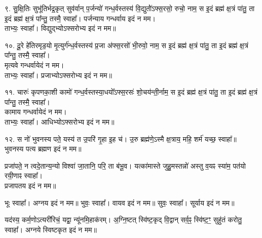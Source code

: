 ९. सु॒क्षि॒तिः सुभू॑तिर्भद्र॒कृत् सुव॑र्वान् प॒र्जन्यो॑ गन्ध॒र्वस्तस्य॑ वि॒द्युतो॑॑ऽफ्स॒रसो॒ रुचो॒ नाम॒ स इ॒दं ब्रह्म॑ क्ष॒त्रं पा॑तु॒ ता इ॒दं ब्रह्म॑ क्ष॒त्रं पा᳚न्तु॒ तस्मै॒ स्वाहा᳚। पर्जन्याय गन्धर्वाय इदं न मम।\\
ताभ्यः॒ स्वाहा᳚। विद्युद्भ्योऽफ्सरोभ्य इदं न मम॥

१०. दू॒रे हे॑तिरमृड॒यो मृ॒त्युर्ग॑न्ध॒र्वस्तस्य॑ प्र॒जा अ॑फ्स॒रसो॑ भी॒रुवो॒ नाम॒ स इ॒दं ब्रह्म॑ क्ष॒त्रं पा॑तु॒ ता इ॒दं ब्रह्म॑ क्ष॒त्रं पा᳚न्तु॒ तस्मै॒ स्वाहा᳚।\\
मृत्यवे गन्धर्वायेदं न मम।\\
ताभ्यः॒ स्वाहा᳚। प्रजाभ्योऽफ्सरोभ्य इदं न मम॥

११. चारुः॑ कृपणका॒शी कामो॑ गन्ध॒र्वस्तस्या॒धयो᳚ऽफ्स॒रसः॑ शो॒चय॑न्ती॒र्नाम॒ स इ॒दं ब्रह्म॑ क्ष॒त्रं पा॑तु॒ ता इ॒दं ब्रह्म॑ क्ष॒त्रं पा᳚न्तु॒ तस्मै॒ स्वाहा᳚।\\
कामाय गन्धर्वायेदं न मम।\\
ताभ्यः॒ स्वाहा᳚। आधिभ्योऽफ्सरोभ्य इदं न मम॥

१२. स नो॑ भुवनस्य पते॒ यस्य॑ त उ॒परि॑ गृ॒हा इ॒ह च॑।
उ॒रु ब्रह्म॑णे॒ऽस्मै क्ष॒त्राय॒ महि॒ शर्म॑ यच्छ॒ स्वाहा᳚॥\\
भुवनस्य पत्य ब्रह्मण इदं न मम॥

प्रजा॑पते॒ न त्वदे॒तान्य॒न्यो विश्वा॑ जा॒तानि॒ परि॒ ता ब॑भू॒व।
यत्का॑मास्ते जुहु॒मस्तन्नो॑ अस्तु व॒यꣴ स्या॑म॒ पत॑यो रयी॒णाꣴ स्वाहा᳚।\\
प्रजापतय इदं न मम॥

भूः स्वाहा᳚। अग्नय इदं न मम॥
भुवः॒ स्वाहा᳚। वायव इदं न मम॥
सुवः॒ स्वाहा᳚। सूर्याय इदं न मम॥

यद॑स्य॒ कर्म॒णोऽत्यरी॑रिचं॒ यद्वा॒ न्यू॑नमि॒हाक॑रम्। अ॒ग्नि॒ष्टत् स्वि॑ष्ट॒कृद् वि॒द्वान् सर्व॒ꣴ॒ स्वि॑ष्ट॒ꣳ॒ सुहु॑तं करोतु॒ स्वाहा᳚। अग्नये स्विष्टकृत इदं न मम॥